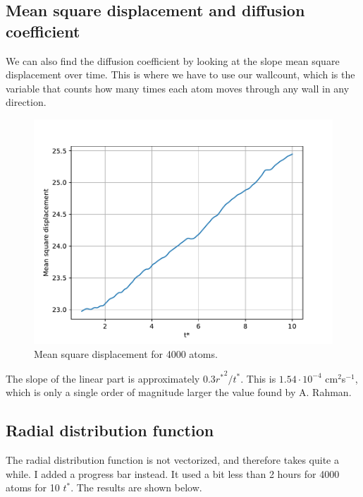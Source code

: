 \documentclass[a4paper,10pt,english]{article}
\begin{document}
\subsection{Mean square displacement and diffusion coefficient} \label{4c}

We can also find the diffusion coefficient by looking at the slope mean square displacement over time. This is where we have to use our wallcount, which is the variable that counts how many times each atom moves through any wall in any direction.

\begin{figure}[h!]
    \centering
    \includegraphics[scale=0.65]{../figures/long_sim_msd.pdf}
    \caption{Mean square displacement for 4000 atoms.}
    \label{msd}
\end{figure}

The slope of the linear part is approximately $0.3{r^*}^2/t^*$. This is $1.54 \cdot 10^{-4}$ cm$^2$s$^{-1}$, which is only a single order of magnitude larger the value found by A. Rahman. 

\newpage

\subsection{Radial distribution function} \label{4d}

The radial distribution function is not vectorized, and therefore takes quite a while. I added a progress bar instead. It used a bit less than 2 hours for 4000 atoms for 10 $t^*$. The results are shown below.
\end{document}
